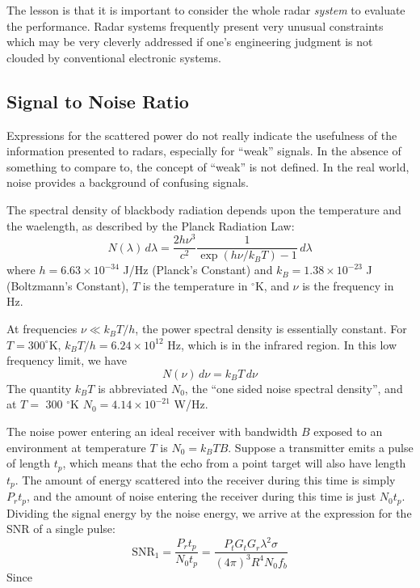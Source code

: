 The lesson is that it is important to consider the whole radar
\textit{system} to evaluate the performance.  Radar systems frequently
present very unusual constraints which may be very cleverly addressed
if one's engineering judgment is not clouded by conventional
electronic systems.

\subsection{Signal to Noise Ratio}

Expressions for the scattered power do not really indicate the
usefulness of the information presented to radars, especially for
``weak'' signals.  In the absence of something to compare to, the
concept of ``weak'' is not defined.  In the real world, noise provides
a background of confusing signals.

The spectral density of blackbody radiation depends upon the
temperature and the waelength, as described by the Planck Radiation
Law:
\begin{equation}
N(\lambda)\,d\lambda = \frac{2h\nu^3}{c^2}\frac{1}{\exp(h\nu/k_B T) -
1}\, d\lambda
\end{equation}
where $h = 6.63\times 10^{-34}$ J/Hz (Planck's Constant) and $k_B =
1.38\times 10^{-23}$ J (Boltzmann's Constant), $T$ is the temperature
in $^\circ$K, and $\nu$ is the frequency in Hz.

At frequencies $\nu \ll k_B T/h$, the power spectral density is
essentially constant.  For $T = 300 ^\circ$K, $k_B T/h = 6.24\times
10^{12}$ Hz, which is in the infrared region.  In this low frequency
limit, we have
\begin{equation}
N(\nu) \, d\nu = k_B T \, d\nu
\end{equation}
The quantity $k_B T$ is abbreviated $N_0$, the ``one sided noise
spectral density'', and at $T = $ 300 $^\circ$K $N_0 = 4.14\times
10^{-21}$ W/Hz.

The noise power entering an ideal receiver with bandwidth $B$ exposed
to an environment at temperature $T$ is $N_0 = k_B T B$.  Suppose a
transmitter emits a pulse of length $t_p$, which means that the echo
from a point target will also have length $t_p$.  The amount of energy
scattered into the receiver during this time is simply $P_r t_p$, and
the amount of noise entering the receiver during this time is just
$N_0 t_p$.  Dividing the signal energy by the noise energy, we arrive
at the expression for the SNR of a single pulse:
\begin{equation}
\textrm{SNR}_1 = \frac{P_r t_p}{N_0 t_p} =
	\frac{P_t G_t G_r \lambda^2 \sigma}{(4\pi)^3 R^4 N_0 f_b}
\end{equation}
Since 
